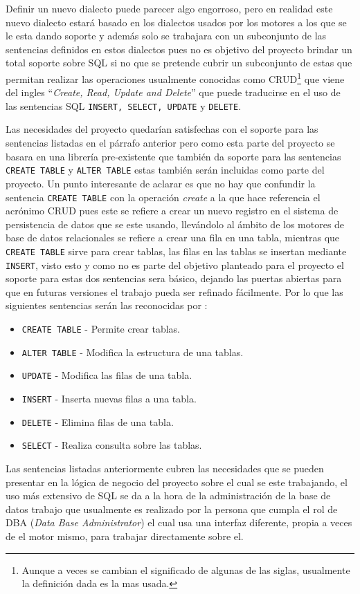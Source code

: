 Definir un nuevo dialecto puede parecer algo engorroso, pero en realidad este nuevo dialecto estará basado en los dialectos usados por los motores a los que se le esta dando soporte y además solo se trabajara con un subconjunto de las sentencias definidos en estos dialectos pues no es objetivo del proyecto brindar un total soporte sobre SQL si no que se pretende cubrir un subconjunto de estas que permitan realizar las operaciones usualmente conocidas como CRUD\footnote{Aunque a veces se cambian el significado de algunas de las siglas, usualmente la definición dada es la mas usada.} que viene del ingles ``\textit{Create, Read, Update and Delete}'' que puede traducirse en el uso de las sentencias SQL \verb=INSERT, SELECT, UPDATE= y \verb=DELETE=.

Las necesidades del proyecto quedarían satisfechas con el soporte para las sentencias listadas en el párrafo anterior pero como esta parte del proyecto se basara en una librería pre-existente que también da soporte para las sentencias \verb=CREATE TABLE= y \verb=ALTER TABLE= estas también serán incluidas como parte del proyecto. Un punto interesante de aclarar es que no hay que confundir la sentencia \verb=CREATE TABLE= con la operación \textit{create} a la que hace referencia el acrónimo CRUD pues este se refiere a crear un nuevo registro en el sistema de persistencia de datos que se este usando, llevándolo al ámbito de los motores de base de datos relacionales se refiere a crear una fila en una tabla, mientras que \verb=CREATE TABLE= sirve para crear tablas, las filas en las tablas se insertan mediante \verb=INSERT=, visto esto y como no es parte del objetivo planteado para el proyecto el soporte para estas dos sentencias sera básico, dejando las puertas abiertas para que en futuras versiones el trabajo pueda ser refinado fácilmente. Por lo que las siguientes sentencias serán las reconocidas por \jj:
%
\begin{itemize}
\item \verb=CREATE TABLE= - Permite crear tablas. 
\item \verb=ALTER TABLE= - Modifica la estructura de una tablas.
\item \verb=UPDATE= - Modifica las filas de una tabla.
\item \verb=INSERT= - Inserta nuevas filas a una tabla.
\item \verb=DELETE= - Elimina filas de una tabla.
\item \verb=SELECT= - Realiza consulta sobre las tablas.
\end{itemize}
%
%
Las sentencias listadas anteriormente cubren las necesidades que se pueden presentar en la lógica de negocio del proyecto sobre el cual se este trabajando, el uso más extensivo de SQL se da a la hora de la administración de la base de datos trabajo que usualmente es realizado por la persona que cumpla el rol de DBA (\textit{Data Base Administrator}) el cual usa una interfaz diferente, propia a veces de el motor mismo, para trabajar directamente sobre el.

